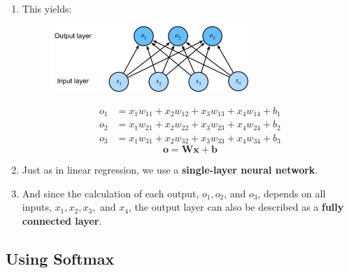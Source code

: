 \begin{enumerate}[itemsep=0.2cm]
    \item This yields:
    \begin{table}[H]
        \begin{minipage}{0.49\linewidth}
            \begin{figure}[H]
                \centering
                \includegraphics[width=\linewidth, height=2.5cm, keepaspectratio]{Pictures/deep_neural_networks/softmaxreg-4.1.1.jpg}
            \end{figure}
        \end{minipage}
        \hfill
        \begin{minipage}{0.49\linewidth}
            \[
                \begin{aligned}
                    o_1 &= x_1 w_{11} + x_2 w_{12} + x_3 w_{13} + x_4 w_{14} + b_1\\
                    o_2 &= x_1 w_{21} + x_2 w_{22} + x_3 w_{23} + x_4 w_{24} + b_2\\
                    o_3 &= x_1 w_{31} + x_2 w_{32} + x_3 w_{33} + x_4 w_{34} + b_3
                \end{aligned}
            \]
            \[ \mathbf{o} = \mathbf{W} \mathbf{x} + \mathbf{b} \]
        \end{minipage}
    \end{table}
    

    \item Just as in linear regression, we use a \textbf{single-layer neural network}. 
    
    \item And since the calculation of each output, $o_1, o_2$, and $o_3$, depends on all inputs, $x_1, x_2, x_3,$ and $x_4$, the output layer can also be described as a \textbf{fully connected layer}.

\end{enumerate}



\subsection*{Using Softmax}

